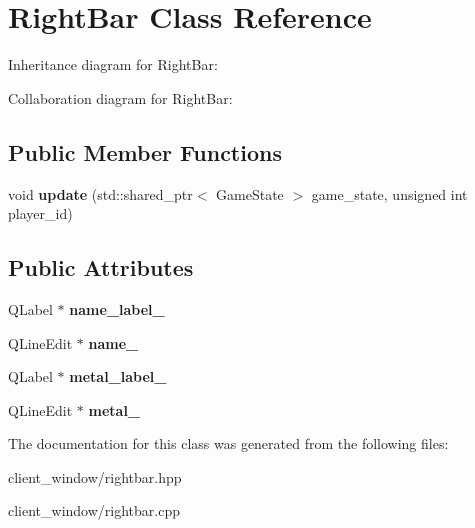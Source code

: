 \hypertarget{classRightBar}{}\section{Right\+Bar Class Reference}
\label{classRightBar}


Inheritance diagram for Right\+Bar\+:


Collaboration diagram for Right\+Bar\+:
\subsection*{Public Member Functions}
\begin{DoxyCompactItemize}
\item 
void {\bfseries update} (std\+::shared\+\_\+ptr$<$ Game\+State $>$ game\+\_\+state, unsigned int player\+\_\+id)\hypertarget{classRightBar_a036206b0b0dd580b42a119c90e62c7ec}{}\label{classRightBar_a036206b0b0dd580b42a119c90e62c7ec}

\end{DoxyCompactItemize}
\subsection*{Public Attributes}
\begin{DoxyCompactItemize}
\item 
Q\+Label $\ast$ {\bfseries name\+\_\+label\+\_\+}\hypertarget{classRightBar_a2b43ef292ae2f85ea8fcda292d55e152}{}\label{classRightBar_a2b43ef292ae2f85ea8fcda292d55e152}

\item 
Q\+Line\+Edit $\ast$ {\bfseries name\+\_\+}\hypertarget{classRightBar_a085dddaede4c7f188eee3c95bd071aa5}{}\label{classRightBar_a085dddaede4c7f188eee3c95bd071aa5}

\item 
Q\+Label $\ast$ {\bfseries metal\+\_\+label\+\_\+}\hypertarget{classRightBar_a21e500f147ae816b54949cbb7fd2b76b}{}\label{classRightBar_a21e500f147ae816b54949cbb7fd2b76b}

\item 
Q\+Line\+Edit $\ast$ {\bfseries metal\+\_\+}\hypertarget{classRightBar_a22b300d256997f1cfd0f7140ca3ae629}{}\label{classRightBar_a22b300d256997f1cfd0f7140ca3ae629}

\end{DoxyCompactItemize}


The documentation for this class was generated from the following files\+:\begin{DoxyCompactItemize}
\item 
client\+\_\+window/rightbar.\+hpp\item 
client\+\_\+window/rightbar.\+cpp\end{DoxyCompactItemize}

